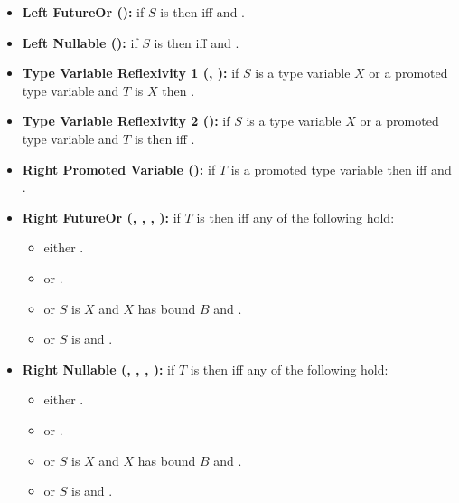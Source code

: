 \documentclass[makeidx]{article}
\begin{document}
{\begin{itemize}
\begin{itemize}
    Otherwise, the query is false.
  \end{itemize}
\item
  \textbf{Left FutureOr (\SrnLeftFutureOr):}
  if $S$ is 
  then  if{}f
   and .
\item
  \textbf{Left Nullable (\SrnLeftNullable):}
  if $S$ is  then  if{}f
   and .
\item
  \textbf{Type Variable Reflexivity 1 %
    (\SrnLeftPromotedVariableOne, \SrnReflexivity*):}
  if $S$ is a type variable $X$
  or a promoted type variable  and $T$ is $X$
  then .
\item
  \textbf{Type Variable Reflexivity 2 (\SrnRightPromotedVariable*):}
  if $S$ is a type variable $X$
  or a promoted type variable 
  and $T$ is 
  then  if{}f .
\item
  \textbf{Right Promoted Variable (\SrnRightPromotedVariable):}
  if $T$ is a promoted type variable 
  then  if{}f  and .
\item
  \textbf{Right FutureOr (\SrnRightFutureOrA, \SrnRightFutureOrB, %
    \SrnLeftVariableBound*, \SrnLeftPromotedVariableTwo*):}
  if $T$ is 
  then  if{}f any of the following hold:
  \begin{itemize}
  \item either .
  \item or .
  \item or $S$ is $X$ and $X$ has bound $B$ and .
  \item or $S$ is  and .
  \end{itemize}
\item
  \textbf{Right Nullable (\SrnRightNullableOne, \SrnRightNullableTwo, %
    \SrnLeftVariableBound*, \SrnLeftPromotedVariableTwo*):}
  if $T$ is 
  then  if{}f any of the following hold:
  \begin{itemize}
  \item either .
  \item or .
  \item or $S$ is $X$ and $X$ has bound $B$ and .
  \item or $S$ is  and .

\end{itemize}
\end{itemize}}
\end{document}
